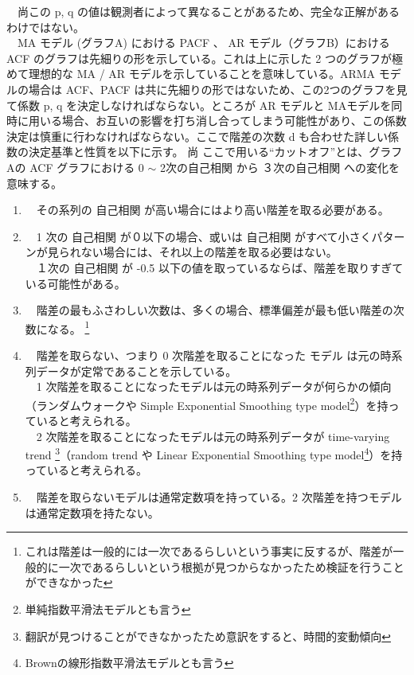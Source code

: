 \documentclass{scrartcl}
\begin{document}
　尚この p, q の値は観測者によって異なることがあるため、完全な正解があるわけではない。\\
　MA モデル (グラフA) における PACF 、 AR モデル（グラフB）における ACF のグラフは先細りの形を示している。これは上に示した 2 つのグラフが極めて理想的な MA / AR モデルを示していることを意味している。ARMA モデルの場合は ACF、PACF は共に先細りの形ではないため、この2つのグラフを見て係数 p, q を決定しなければならない。ところが AR モデルと MAモデルを同時に用いる場合、お互いの影響を打ち消し合ってしまう可能性があり、この係数決定は慎重に行わなければならない。ここで階差の次数 d も合わせた詳しい係数の決定基準と性質を以下に示す。\cite{acf-pacf} 尚 ここで用いる``カットオフ''とは、グラフAの ACF グラフにおける 0 \(\sim\) 2次の自己相関 から ３次の自己相関 への変化を意味する。\\
\begin{enumerate}
\item 　その系列の 自己相関 が高い場合にはより高い階差を取る必要がある。\\
\item 　1 次の 自己相関 が０以下の場合、或いは 自己相関 がすべて小さくパターンが見られない場合には、それ以上の階差を取る必要はない。\\
　１次の 自己相関 が -0.5 以下の値を取っているならば、階差を取りすぎている可能性がある。\\
\item 　階差の最もふさわしい次数は、多くの場合、標準偏差が最も低い階差の次数になる。 \footnote{これは階差は一般的には一次であるらしいという事実に反するが、階差が一般的に一次であるらしいという根拠が見つからなかったため検証を行うことができなかった}\\
\item 　階差を取らない、つまり 0 次階差を取ることになった モデル は元の時系列データが定常であることを示している。\\
　1 次階差を取ることになったモデルは元の時系列データが何らかの傾向（ランダムウォークや Simple Exponential Smoothing type model\footnote{単純指数平滑法モデルとも言う}）を持っていると考えられる。\\
　2 次階差を取ることになったモデルは元の時系列データが time-varying trend \footnote{翻訳が見つけることができなかったため意訳をすると、時間的変動傾向}（random trend や Linear Exponential Smoothing type model\footnote{Brownの線形指数平滑法モデルとも言う}）を持っていると考えられる。\\
\item 　階差を取らないモデルは通常定数項を持っている。2 次階差を持つモデルは通常定数項を持たない。\\

\end{enumerate}
\end{document}
